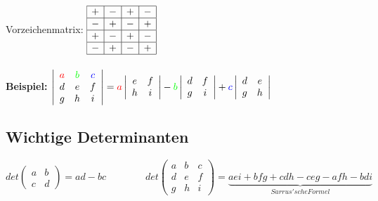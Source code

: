 	Vorzeichenmatrix: $\begin{array}{|c|c|c|c|}
		\hline + & - & + & - \\
		\hline - & + & - & + \\
		\hline + & - & + & - \\
		\hline - & + & - & + \\
		\hline \end{array}$ \\ \\

	\textbf{Beispiel:} $\left|\begin{array}{ccc}
		\color{red}a & \color{green}b & \color{blue}c \\
		d & e & f \\
		g & h & i \end{array}\right| 
	= {\color{red}a} \left|\begin{array}{cc}
		e & f \\
		h & i \end{array}\right| 
	- {\color{green}b} \left|\begin{array}{cc}
		d & f \\
		g & i \end{array}\right|
	+ {\color{blue}c} \left|\begin{array}{cc}
		d & e \\
		g & h \end{array}\right|$ \\

\subsection{Wichtige Determinanten}
	$det\left(\begin{array}{cc}
		a & b \\
		c & d \end{array}\right)
	= ad - bc \qquad \qquad
	det\left(\begin{array}{ccc}
		a & b & c \\
		d & e & f \\
		g & h & i \end{array}\right)
	= \underbrace{aei + bfg + cdh - ceg - afh - bdi}_{Sarrus'sche Formel}$

